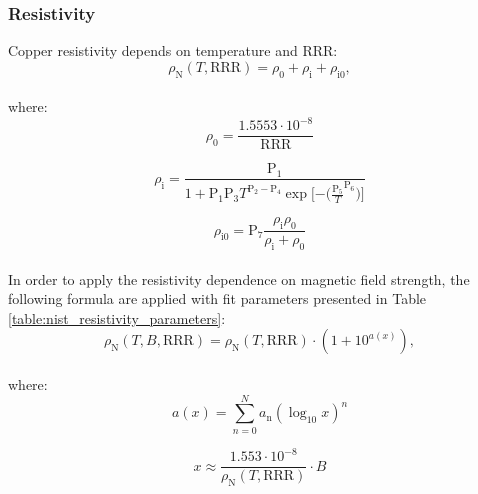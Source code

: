 
\subsubsection{Resistivity}
Copper resistivity depends on temperature and RRR:
\begin{equation}
    \rho_\text{N}(T, \text{RRR}) = \rho_\text{0}+\rho_\text{i}+\rho_\text{i0},
\end{equation}
\\
where:
\begin{equation}
    \rho_\text{0} = \frac{1.5553\cdot10^{-8}}{\text{RRR}}
\end{equation}

\begin{equation}
    \rho_\text{i} = \frac{\text{P}_\text{1}}{1+\text{P}_\text{1}  \text{P}_\text{3}  T^{\text{P}_\text{2} - \text{P}_\text{4}}  \exp{[-(\frac{\text{P}_\text{5}}{T}}^{\text{P}_\text{6}})]}
\end{equation}

\begin{equation}
    \rho_\text{i0} = \text{P}_\text{7} \frac{\rho_\text{i} \rho_\text{0}}{\rho_\text{i} + \rho_\text{0}}
\end{equation}
\\
In order to apply the resistivity dependence on magnetic field strength, the following formula are applied with fit parameters presented in Table \ref{table:nist_resistivity_parameters}:
\begin{equation}
    \rho_\text{N}(T, B, \text{RRR}) = \rho_\text{N}(T, \text{RRR}) \cdot (1 + 10^{a(x)}),  
\end{equation}
\\
where:
\begin{equation}
    a(x) = \sum_{n=0}^{N} a_\text{n}(\log_\text{10}x)^{n}
\end{equation}

\begin{equation}
    x \approx \frac{1.553 \cdot 10^{-8}}{\rho_\text{N}(T, \text{RRR})} \cdot B
\end{equation}

